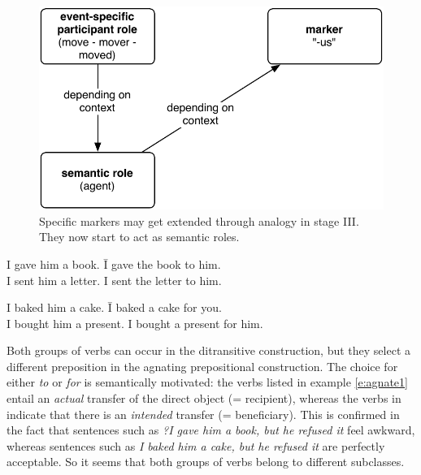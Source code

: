 \begin{figure}[t]
\centerline{\includegraphics[scale=0.6]{chap-introduction/figs/stage3}}
  \caption[Formation of case markers: stage III]{Specific markers may get extended through analogy in stage III. They now start to act as semantic roles.}
   \label{f:stage3}
\end{figure}

\ea
\label{e:agnate1}
\begin{tabbing}
I gave him a book. \hspace{2cm} \= I gave the book to him.
\\ I sent him a letter. \> I sent the letter to him.
\end{tabbing}
\z
\ea
\label{e:agnate2}
\begin{tabbing}
I baked him a cake. \hspace{1,85cm} \= I baked a cake for you.
\\I bought him a present. \> I bought a present for him.
\end{tabbing}
\z

Both groups of verbs can occur in the ditransitive construction, but they select a different preposition in the agnating prepositional construction. The choice for either {\em to} or {\em for} is semantically motivated: the verbs listed in example \ref{e:agnate1} entail an {\em actual} transfer of the direct object (= recipient), whereas the verbs in  indicate that there is an {\em intended} transfer (= beneficiary). This is confirmed in the fact that sentences such as {\em ?I gave him a book, but he refused it} feel awkward, whereas sentences such as {\em I baked him a cake, but he refused it} are perfectly acceptable. So it seems that both groups of verbs belong to different subclasses.

